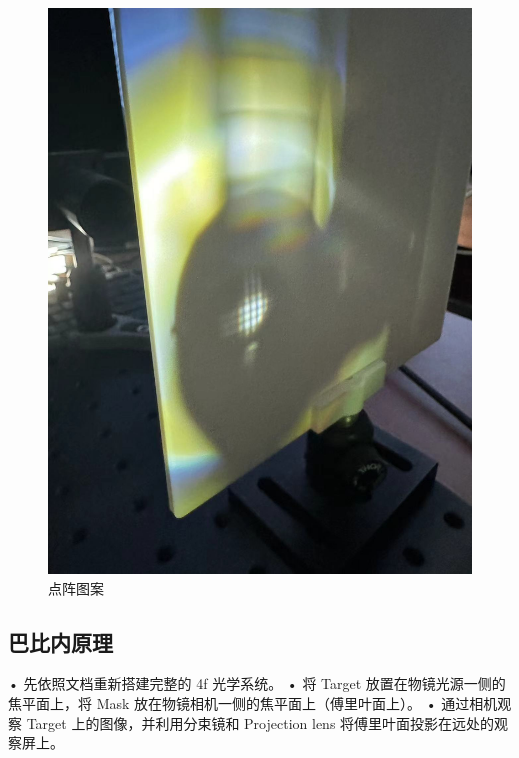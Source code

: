 \documentclass{ctexart}
\begin{document}
\begin{figure}[H]
\begin{minipage}[b]{0.2\textwidth}
    \includegraphics[width=\textwidth]{pictures/微信图片_20241010201031.jpg}
    \caption{点阵图案}
  \end{minipage}
\end{figure}
\subsection{巴比内原理}
• 先依照文档重新搭建完整的 4f 光学系统。  
• 将 Target 放置在物镜光源一侧的焦平面上，将 Mask 放在物镜相机一侧的焦平面上（傅里叶面上）。  
• 通过相机观察 Target 上的图像，并利用分束镜和 Projection lens 将傅里叶面投影在远处的观察屏上。
\end{document}
